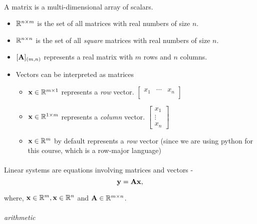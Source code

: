 \documentclass[../main.tex]{subfiles}
\begin{document}
\paragraph{ }
\keyword{\textcolor{blue}{Matrices}} 
A matrix is a multi-dimensional array of scalars. 
\begin{itemize}
  \item $\mathbb{R}^{n \times m}$ is the set of all matrices with real numbers of size $n$.
  \item $\mathbb{R}^{n \times n}$ is the set of all \textit{square} matrices with real numbers of size $n$.
  \item $[\mathbf{A}]_{(m, n)}$ represents a real matrix with $m$ rows and $n$ columns.
  \item Vectors can be interpreted as matrices
    \begin{itemize}
      \item $\mathbf{x} \in \mathbb{R}^{m \times 1}$ represents a \textit{row} vector. $\begin{bmatrix}
          x_1 & \cdots & x_n \\
      \end{bmatrix}$
    \item $\mathbf{x} \in \mathbb{R}^{1 \times m}$ represents a \textit{column} vector. $\begin{bmatrix}
        x_1 \\ \vdots \\ x_n 
    \end{bmatrix}$
  \item $\mathbf{x} \in \mathbb{R}^{m}$ by default represents a \textit{row} vector (since we are using python for this course, which is a row-major language)
    \end{itemize}
\end{itemize}

\paragraph{ }
Linear systems are equations involving matrices and vectors - 
\begin{equation*}
  \mathbf{y} = \mathbf{A} \mathbf{x}, 
\end{equation*}

where, $\mathbf{x}\in \mathbb{R}^m, \mathbf{x}\in \mathbb{R}^n$  and $\mathbf{A} \in \mathbb{R}^{m \times n}$.

\paragraph{ }

\textit{arithmetic}
\end{document}
